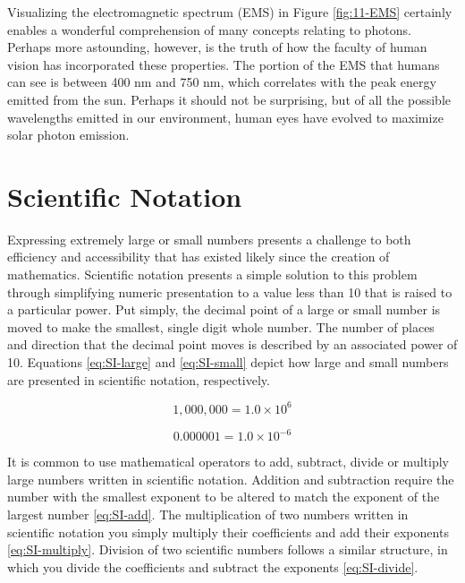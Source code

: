 \documentclass[
]{book}
\begin{document}
Visualizing the electromagnetic spectrum (EMS) in Figure \ref{fig:11-EMS} certainly
enables a wonderful comprehension of many concepts relating to photons.
Perhaps more astounding, however, is the truth of how the faculty of
human vision has incorporated these properties. The portion of the EMS
that humans can see is between 400 nm and 750 nm, which correlates with
the peak energy emitted from the sun. Perhaps it should not be
surprising, but of all the possible wavelengths emitted in our
environment, human eyes have evolved to maximize solar photon emission.

\hypertarget{scientific-notation}{%
\section{Scientific Notation}\label{scientific-notation}}

Expressing extremely large or small numbers presents a challenge to both
efficiency and accessibility that has existed likely since the creation
of mathematics. Scientific notation presents a simple solution to this
problem through simplifying numeric presentation to a value less than 10
that is raised to a particular power. Put simply, the decimal point of a
large or small number is moved to make the smallest, single digit whole
number. The number of places and direction that the decimal point moves
is described by an associated power of 10. Equations \eqref{eq:SI-large}
and \eqref{eq:SI-small} depict how large and small numbers are presented
in scientific notation, respectively.

\begin{equation}
1,000,000 = 1.0 × 10^{6} 
\label{eq:SI-large}
\end{equation}

\begin{equation}
0.000001 = 1.0 × 10 ^{-6} 
\label{eq:SI-small}
\end{equation}

It is common to use mathematical operators to add, subtract, divide or
multiply large numbers written in scientific notation. Addition and
subtraction require the number with the smallest exponent to be altered
to match the exponent of the largest number \eqref{eq:SI-add}. The
multiplication of two numbers written in scientific notation you simply
multiply their coefficients and add their exponents
\eqref{eq:SI-multiply}. Division of two scientific numbers follows a
similar structure, in which you divide the coefficients and subtract the
exponents \eqref{eq:SI-divide}.
\end{document}
